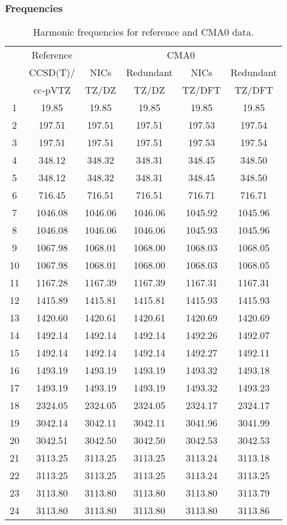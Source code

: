 \documentclass[10pt,oneside]{article}
\begin{document}
\begin{table}[h!]
\subsubsection*{Frequencies}
\centering
\caption{Harmonic frequencies for reference and CMA0 data.}
\begin{tabular}{cccccc}
\toprule
{} & Reference & \multicolumn{4}{c}{CMA0} \\
{} &  CCSD(T)/ &    NICs &  Redundant &    NICs & Redundant \\
{} &   cc-pVTZ &   TZ/DZ &      TZ/DZ &  TZ/DFT &    TZ/DFT \\
\midrule
1  &     19.85 &   19.85 &      19.85 &   19.85 &     19.85 \\
2  &    197.51 &  197.51 &     197.51 &  197.53 &    197.54 \\
3  &    197.51 &  197.51 &     197.51 &  197.53 &    197.54 \\
4  &    348.12 &  348.32 &     348.31 &  348.45 &    348.50 \\
5  &    348.12 &  348.32 &     348.31 &  348.45 &    348.50 \\
6  &    716.45 &  716.51 &     716.51 &  716.71 &    716.71 \\
7  &   1046.08 & 1046.06 &    1046.06 & 1045.92 &   1045.96 \\
8  &   1046.08 & 1046.06 &    1046.06 & 1045.93 &   1045.96 \\
9  &   1067.98 & 1068.01 &    1068.00 & 1068.03 &   1068.05 \\
10 &   1067.98 & 1068.01 &    1068.00 & 1068.03 &   1068.05 \\
11 &   1167.28 & 1167.39 &    1167.39 & 1167.31 &   1167.31 \\
12 &   1415.89 & 1415.81 &    1415.81 & 1415.93 &   1415.93 \\
13 &   1420.60 & 1420.61 &    1420.61 & 1420.69 &   1420.69 \\
14 &   1492.14 & 1492.14 &    1492.14 & 1492.26 &   1492.07 \\
15 &   1492.14 & 1492.14 &    1492.14 & 1492.27 &   1492.11 \\
16 &   1493.19 & 1493.19 &    1493.19 & 1493.32 &   1493.18 \\
17 &   1493.19 & 1493.19 &    1493.19 & 1493.32 &   1493.23 \\
18 &   2324.05 & 2324.05 &    2324.05 & 2324.17 &   2324.17 \\
19 &   3042.14 & 3042.11 &    3042.11 & 3041.96 &   3041.99 \\
20 &   3042.51 & 3042.50 &    3042.50 & 3042.53 &   3042.53 \\
21 &   3113.25 & 3113.25 &    3113.25 & 3113.24 &   3113.18 \\
22 &   3113.25 & 3113.25 &    3113.25 & 3113.24 &   3113.25 \\
23 &   3113.80 & 3113.80 &    3113.80 & 3113.80 &   3113.79 \\
24 &   3113.80 & 3113.80 &    3113.80 & 3113.80 &   3113.86 \\
\bottomrule
\end{tabular}
\end{table}
\end{document}
